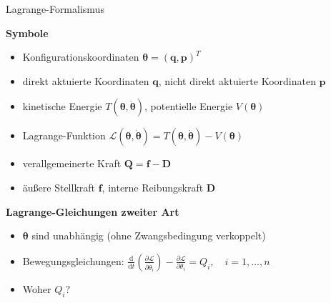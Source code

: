 \documentclass[
	ngerman,
	10pt,				%
	aspectratio=169 	%
]{beamer}
\begin{document}
\begin{frame}[t,fragile,label=Lagrange2_1]{\large Lagrange-Formalismus}
	
	\textbf{Symbole}
	\begin{itemize}
		\item Konfigurationskoordinaten $\boldsymbol{\theta} = (\mathbf{q}, \mathbf{p})^T$
		\pause
		\item direkt aktuierte Koordinaten $\mathbf{q}$, nicht direkt aktuierte Koordinaten $\mathbf{p}$
		\pause
		\item kinetische Energie $T(\boldsymbol{\theta}, \dot{\boldsymbol{\theta}})$, potentielle Energie $V(\boldsymbol{\theta})$
		\pause
		\item Lagrange-Funktion $\mathcal{L}(\boldsymbol{\theta}, \dot{\boldsymbol{\theta}}) = T(\boldsymbol{\theta}, \dot{\boldsymbol{\theta}}) - V(\boldsymbol{\theta})$
		\pause
		\item verallgemeinerte Kraft $\mathbf{Q} = \mathbf{f} - \mathbf{D}$
		\pause
		\item äußere Stellkraft $\mathbf{f}$, interne Reibungskraft $\mathbf{D}$
	\end{itemize}
	
	\pause
	\bigskip
	\textbf{Lagrange-Gleichungen zweiter Art}
	\begin{itemize}
		\pause
		\item  $\boldsymbol{\theta}$ sind unabhängig (ohne Zwangsbedingung verkoppelt)
		\pause
		\item Bewegungsgleichungen:  $\frac{\mathrm{d}}{\mathrm{d} t} \left(\frac{\partial \mathcal{L}}{\partial \dot{\theta}_i} \right) - \frac{\partial \mathcal{L}}{\partial \theta_i} = Q_i, \quad i = 1, \ldots, n$
		\pause
		\item Woher $Q_i$?
	\end{itemize}
	
\end{frame}

\end{document}
